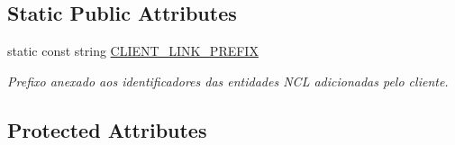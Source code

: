 \subsection*{Static Public Attributes}
\begin{DoxyCompactItemize}
\item 
static const string \hyperlink{classbr_1_1ufscar_1_1lince_1_1ginga_1_1wac_1_1editing_1_1ClientEditingManager_ad67459adf66064e713ba4fbf1870ce26}{CLIENT\_\-LINK\_\-PREFIX}
\begin{DoxyCompactList}\small\item\em Prefixo anexado aos identificadores das entidades NCL adicionadas pelo cliente. \item\end{DoxyCompactList}\end{DoxyCompactItemize}
\subsection*{Protected Attributes}
